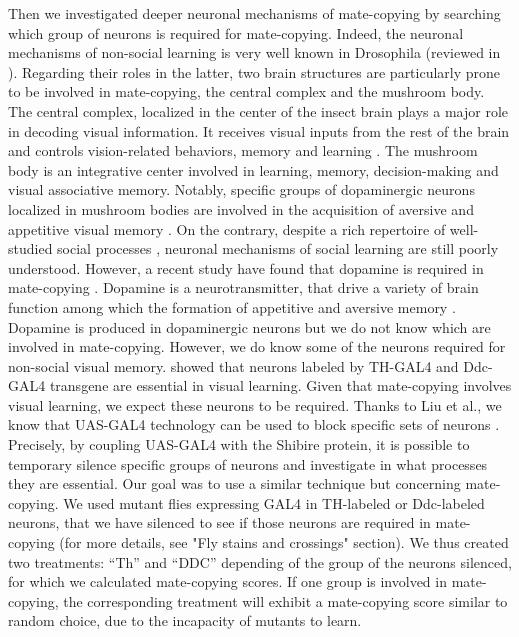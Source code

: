 \documentclass[a4paper, 12pt]{article}
\begin{document}
	Then we investigated deeper neuronal mechanisms of mate-copying by searching which group of neurons is required for mate-copying. 
	Indeed, the neuronal mechanisms of non-social learning is very well known in Drosophila (reviewed in \textcite{cognigni_right_2018}).
	Regarding their roles in the latter, two brain structures are particularly prone to be involved in mate-copying, the central complex and the mushroom body.
	The central complex, localized in the center of the insect brain plays a major role in decoding visual information.
	It receives visual inputs from the rest of the brain and controls vision-related behaviors, memory and learning \parencite{guo_vision_2017}.
	The mushroom body is an integrative center involved in learning, memory, decision-making  and visual associative memory.
	Notably, specific groups of dopaminergic neurons localized in mushroom bodies are involved in the acquisition of aversive and appetitive visual  memory \parencite{liu_subset_2012, vogt_shared_2014}. 
	On the contrary, despite a rich repertoire of well-studied social processes \parencite{pasquaretta_how_2016, teseo_fighting_2016, dawson_social_2018}, neuronal mechanisms of social learning are still poorly understood. 
	However, a recent study have found that dopamine is required in mate-copying \parencite{monier_dopamine_2018}.
	Dopamine is a neurotransmitter, that drive a  variety of brain function among which the formation of appetitive and aversive memory \parencite{riemensperger_punishment_2005,sitaraman_serotonin_2008,alekseyenko_targeted_2010,berry_dopamine_2012,yamamoto_dopamine_2014}. Dopamine is produced in dopaminergic neurons but we do not know which are involved in mate-copying. 
	However, we do know some of the neurons required for non-social visual memory.
	\textcite{vogt_shared_2014} showed that neurons labeled by TH-GAL4 and Ddc-GAL4 transgene are essential in visual learning. 
	Given that mate-copying involves visual learning, we expect these neurons to be required.
	Thanks to Liu et al., we know that UAS-GAL4 technology can be used to block specific sets of neurons \parencite{liu_subset_2012}. Precisely, by coupling UAS-GAL4 with the Shibire protein, it is possible to temporary silence specific groups of neurons and investigate in what processes they are essential. 
	Our goal was to use a similar technique but concerning mate-copying. We used mutant flies expressing GAL4 in TH-labeled or Ddc-labeled neurons, that we have silenced to see if those neurons are required in mate-copying (for more details, see "Fly stains and crossings" section). 
	We thus created two treatments: ``Th'' and ``DDC'' depending of the group of the neurons silenced, for which we calculated mate-copying scores. 
	If one group is involved in mate-copying, the corresponding treatment will exhibit a mate-copying score similar to random choice, due to the incapacity of mutants to learn.
	
\end{document}
